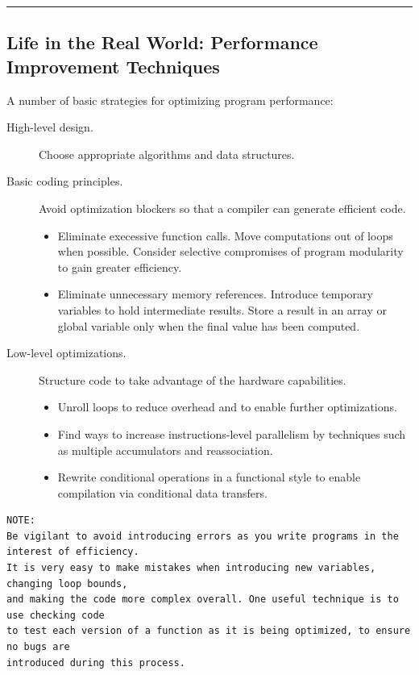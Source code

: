 \documentclass[11pt]{article}
\begin{document}
\noindent\rule{\textwidth}{0.5pt}

\subsection{Life in the Real World: Performance Improvement Techniques}
\label{sec:org8cf795f}

A number of basic strategies for optimizing program performance:\\
\begin{description}
\item[{High-level design.}] Choose appropriate algorithms and data structures.\\
\item[{Basic coding principles.}] Avoid optimization blockers so that a compiler can generate efficient code.\\
\begin{itemize}
\item Eliminate execessive function calls. Move computations out of loops when possible. Consider selective compromises of program modularity to gain greater efficiency.\\
\item Eliminate unnecessary memory references. Introduce temporary variables to hold intermediate results. Store a result in an array or global variable only when the final value has been computed.\\
\end{itemize}
\item[{Low-level optimizations.}] Structure code to take advantage of the hardware capabilities.\\
\begin{itemize}
\item Unroll loops to reduce overhead and to enable further optimizations.\\
\item Find ways to increase instructions-level parallelism by techniques such as multiple accumulators and reassociation.\\
\item Rewrite conditional operations in a functional style to enable compilation via conditional data transfers.\\
\end{itemize}
\end{description}

\begin{verbatim}
NOTE:
Be vigilant to avoid introducing errors as you write programs in the interest of efficiency.
It is very easy to make mistakes when introducing new variables, changing loop bounds, 
and making the code more complex overall. One useful technique is to use checking code 
to test each version of a function as it is being optimized, to ensure no bugs are 
introduced during this process. 
\end{verbatim}
\end{document}
